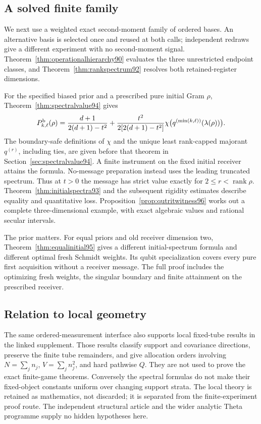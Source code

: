 \subsection{A solved finite family}
We next use a weighted exact second-moment family of ordered bases.
An alternative basis is selected once and reused at both calls;
independent redraws give a different experiment with no second-moment
signal.  Theorem~\ref{thm:operationalhierarchy90} evaluates the three
unrestricted endpoint classes, and Theorem~\ref{thm:rankspectrum92}
resolves both retained-register dimensions.

For the specified biased prior and a prescribed pure initial Gram
$\rho$, Theorem~\ref{thm:spectralvalue94} gives
\[
 P_{k,\ell}^{\rm b}(\rho)
  =\frac{d+1}{2(d+1)-t^2}
       +\frac{t^2}{2[2(d+1)-t^2]}
             \chi\bigl(q^{(\min(k,\ell))}(\lambda(\rho))\bigr).
\]
The boundary-safe definitions of $\chi$ and the unique least rank-capped
majorant $q^{(r)}$, including ties, are given before that theorem in
Section~\ref{sec:spectralvalue94}.  A finite instrument on the fixed
initial receiver attains the formula.  No-message preparation instead
uses the leading truncated spectrum.  Thus at $t>0$ the message has
strict value exactly for $2\le r<\operatorname{rank}\rho$.
Theorem~\ref{thm:initialspectra93} and the subsequent rigidity estimates
describe equality and quantitative loss.  Proposition~\ref{prop:qutritwitness96}
works out a complete three-dimensional example, with exact algebraic
values and rational secular intervals.

The prior matters.  For equal priors and old receiver dimension two,
Theorem~\ref{thm:equalinitial95} gives a different initial-spectrum
formula and different optimal fresh Schmidt weights.  Its qubit
specialization covers every pure first acquisition without a receiver
message.  The full proof includes the optimizing fresh weights, the singular
boundary and finite attainment on the prescribed receiver.

\subsection{Relation to local geometry}
The same ordered-measurement interface also supports local fixed-tube
results in the linked supplement.  Those results classify support and
covariance directions, preserve the finite tube remainders, and give
allocation orders involving $N=\sum_jn_j$, $V=\sum_jn_j^2$, and hard
pathwise $Q$.  They are not used to prove the exact finite-game theorems.
Conversely the spectral formulas do not make their fixed-object
constants uniform over changing support strata.  The local theory is
retained as mathematics, not discarded; it is separated from the
finite-experiment proof route.  The independent structural article and
the wider analytic Theta programme supply no hidden hypotheses here.
